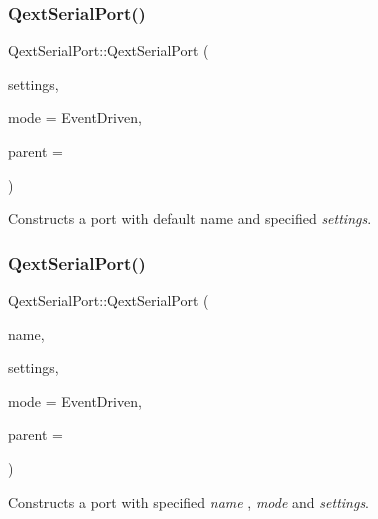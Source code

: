 \subsubsection{\texorpdfstring{Qext\+Serial\+Port()}{QextSerialPort()}\hspace{0.1cm}{\footnotesize\ttfamily [3/4]}}
{\footnotesize\ttfamily Qext\+Serial\+Port\+::\+Qext\+Serial\+Port (\begin{DoxyParamCaption}\item[{const \hyperlink{structPortSettings}{Port\+Settings} \&}]{settings,  }\item[{\hyperlink{classQextSerialPort_a6002128d7351ea9a958d6a6d1fc6b9bd}{Qext\+Serial\+Port\+::\+Query\+Mode}}]{mode = {\ttfamily EventDriven},  }\item[{Q\+Object $\ast$}]{parent = {} }\end{DoxyParamCaption})\hspace{0.3cm}{\ttfamily [explicit]}}

Constructs a port with default name and specified {\itshape settings}. \mbox{\label{classQextSerialPort_aff4f0246637293ba6751a5993a645b20}} 
\subsubsection{\texorpdfstring{Qext\+Serial\+Port()}{QextSerialPort()}\hspace{0.1cm}{\footnotesize\ttfamily [4/4]}}
{\footnotesize\ttfamily Qext\+Serial\+Port\+::\+Qext\+Serial\+Port (\begin{DoxyParamCaption}\item[{const Q\+String \&}]{name,  }\item[{const \hyperlink{structPortSettings}{Port\+Settings} \&}]{settings,  }\item[{\hyperlink{classQextSerialPort_a6002128d7351ea9a958d6a6d1fc6b9bd}{Qext\+Serial\+Port\+::\+Query\+Mode}}]{mode = {\ttfamily EventDriven},  }\item[{Q\+Object $\ast$}]{parent = {} }\end{DoxyParamCaption})}

Constructs a port with specified {\itshape name} , {\itshape mode} and {\itshape settings}. \mbox{\label{classQextSerialPort_a0712978a092762f69f308df7372e3f7a}} 

